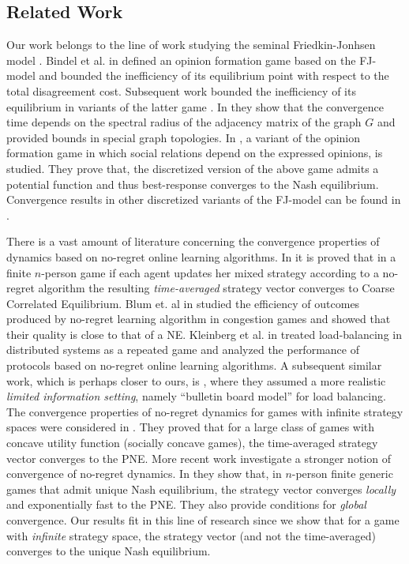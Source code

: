 \subsection{Related Work}
Our work belongs to the line of work studying the seminal Friedkin-Jonhsen
model \cite{FJ90}. Bindel et al. in \cite{BKO11} defined an opinion
formation game based on the FJ-model and bounded the inefficiency
of its equilibrium point with respect to the total disagreement cost.
Subsequent work bounded the inefficiency of its equilibrium in variants
of the latter game \cite{BGM13,EFHS17,CKO13,BFM16}.
In \cite{GS14} they show that the convergence time depends on
the spectral radius of the adjacency matrix of the graph $G$
and provided bounds in special graph topologies.
In \cite{BFM16}, a variant of the opinion formation game in which social
relations depend on the expressed opinions, is studied.
They prove that, the discretized version of the above game admits
a potential function and thus best-response converges to the
Nash equilibrium. Convergence results in other discretized variants of
the FJ-model can be found in \cite{YOASS13,FGV16}.

There is a vast amount of literature concerning the convergence
properties of dynamics based on no-regret online learning algorithms.
In \cite{FV97,FS99,SA00,SALS15} it is proved that in a finite $n$-person
game if each agent updates her mixed strategy according to a no-regret
algorithm the resulting \emph{time-averaged} strategy vector converges to
Coarse Correlated Equilibrium. Blum et. al in \cite{BEL06,BHLR08}
studied the efficiency of outcomes produced by no-regret
learning algorithm in congestion games and showed that
their quality is close to that of a NE.
Kleinberg et al. in \cite{KPT09} treated load-balancing in distributed systems as
a repeated game and analyzed the performance of protocols based on
no-regret online learning algorithms.
A subsequent similar work, which is perhaps closer to ours, is \cite{KPT11},
where they assumed a more realistic \emph{limited information setting},
namely \enquote{bulletin board model} for load balancing.
The convergence properties of no-regret dynamics for games with
infinite strategy spaces were considered in \cite{EMN09}.
They proved that for a large class of games with concave utility function
(socially concave games), the time-averaged strategy vector converges to
the PNE.
More recent work investigate a stronger notion of convergence of
no-regret dynamics. In \cite{CHM17} they show that,
in $n$-person finite generic games that admit unique Nash equilibrium,
the strategy vector converges \emph{locally} and exponentially fast
to the PNE. They also provide conditions for \emph{global} convergence.
Our results fit in this line of research since we show that
for a game with \emph{infinite} strategy space, the strategy vector
(and not the time-averaged) converges to the unique Nash equilibrium.
